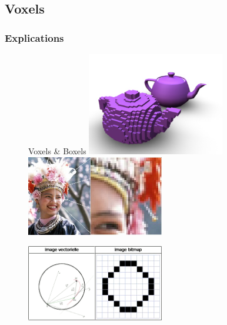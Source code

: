\documentclass{beamer}
\begin{document}
\subsection{Voxels}
\subsubsection{Explications}
\begin{frame}
 \begin{center}
  \begin{figure}
   Voxels \& Boxels
   \includegraphics[width=6cm]{Images/Images_Alexis/voxel_teapot.jpg}
   \includegraphics[width=6cm]{Images/Images_Alexis/example_matricielle.jpg}
  \end{figure}
  \begin{figure}
   \includegraphics[width=6cm]{Images/Images_Alexis/comparaison_vecteur_matrice.png}
  \end{figure}
 \end{center}
\end{frame}
\end{document}
